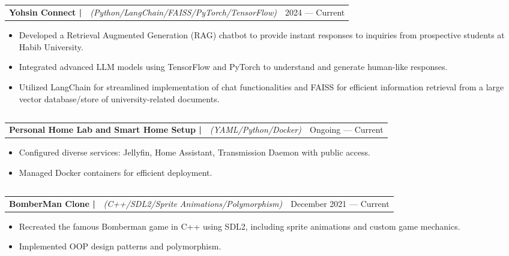 \documentclass{article}%
\begin{document}
\subsection*{}%
\label{subsec:}%
\vspace{-4mm}%
\begin{tabularx}{\textwidth}{cXr}%
\textbf{Yohsin Connect |}&\textit{ (Python/LangChain/FAISS/PyTorch/TensorFlow)}&2024 — Current\\%
\end{tabularx}%
\begin{itemize}%
\item%
Developed a Retrieval Augmented Generation (RAG) chatbot to provide instant responses to inquiries from prospective students at Habib University.%
\item%
Integrated advanced LLM models using TensorFlow and PyTorch to understand and generate human{-}like responses.%
\item%
Utilized LangChain for streamlined implementation of chat functionalities and FAISS for efficient information retrieval from a large vector database/store of university{-}related documents.%
\end{itemize}

%
\subsection*{}%
\label{subsec:}%
\vspace{-4mm}%
\begin{tabularx}{\textwidth}{cXr}%
\textbf{Personal Home Lab and Smart Home Setup |}&\textit{ (YAML/Python/Docker)}&Ongoing — Current\\%
\end{tabularx}%
\begin{itemize}%
\item%
Configured diverse services: Jellyfin, Home Assistant, Transmission Daemon with public access.%
\item%
Managed Docker containers for efficient deployment.%
\end{itemize}

%
\subsection*{}%
\label{subsec:}%
\vspace{-4mm}%
\begin{tabularx}{\textwidth}{cXr}%
\textbf{BomberMan Clone |}&\textit{ (C++/SDL2/Sprite Animations/Polymorphism)}&December 2021 — Current\\%
\end{tabularx}%
\begin{itemize}%
\item%
Recreated the famous Bomberman game in C++ using SDL2, including sprite animations and custom game mechanics.%
\item%
Implemented OOP design patterns and polymorphism.%
\end{itemize}

%
\end{document}
